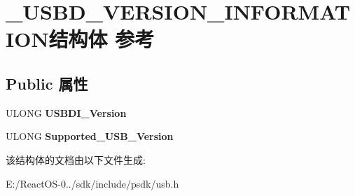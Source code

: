 \hypertarget{struct___u_s_b_d___v_e_r_s_i_o_n___i_n_f_o_r_m_a_t_i_o_n}{}\section{\+\_\+\+U\+S\+B\+D\+\_\+\+V\+E\+R\+S\+I\+O\+N\+\_\+\+I\+N\+F\+O\+R\+M\+A\+T\+I\+O\+N结构体 参考}
\label{struct___u_s_b_d___v_e_r_s_i_o_n___i_n_f_o_r_m_a_t_i_o_n}
\subsection*{Public 属性}
\begin{DoxyCompactItemize}
\item 
\mbox{\label{struct___u_s_b_d___v_e_r_s_i_o_n___i_n_f_o_r_m_a_t_i_o_n_a3115154259e9eaaf8a9400484ce934ba}} 
U\+L\+O\+NG {\bfseries U\+S\+B\+D\+I\+\_\+\+Version}
\item 
\mbox{\label{struct___u_s_b_d___v_e_r_s_i_o_n___i_n_f_o_r_m_a_t_i_o_n_a29c1837b6fabbb8c15e72cc47e4a50b7}} 
U\+L\+O\+NG {\bfseries Supported\+\_\+\+U\+S\+B\+\_\+\+Version}
\end{DoxyCompactItemize}


该结构体的文档由以下文件生成\+:\begin{DoxyCompactItemize}
\item 
E\+:/\+React\+O\+S-\/0../sdk/include/psdk/usb.\+h\end{DoxyCompactItemize}
